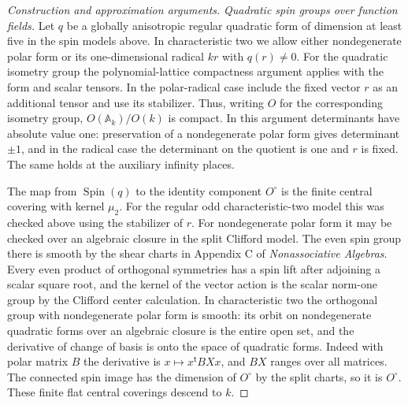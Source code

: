 \documentclass[11pt,a4paper,openany,oneside]{book}
\theoremstyle{resultstyle}
\theoremstyle{definition}
\numberwithin{equation}{chapter}
\begin{document}
\begin{proof}[Construction and approximation arguments]
\medskip\noindent
\textit{Quadratic spin groups over function fields.}
Let \(q\) be a globally anisotropic regular quadratic
form of dimension at least five in the spin models
above. In characteristic two we allow either
nondegenerate polar form or its one-dimensional
radical \(kr\) with \(q(r)\ne0\). For the quadratic
isometry group the polynomial-lattice compactness
argument applies with the form and scalar tensors.
In the polar-radical case include the fixed vector
\(r\) as an additional tensor and use its stabilizer.
Thus, writing \(O\) for the corresponding isometry
group, \(O(\mathbb A_k)/O(k)\) is compact. In this
argument determinants have absolute value one:
preservation of a nondegenerate polar form gives
determinant \(\pm1\), and in the radical case the
determinant on the quotient is one and \(r\) is fixed.
The same holds at the auxiliary infinity places.

The map from \(\operatorname{Spin}(q)\) to the
identity component \(O^\circ\) is the finite
central covering with kernel \(\mu_2\).
For the regular odd characteristic-two model this
was checked above using the stabilizer of \(r\).
For nondegenerate polar form it may be checked over
an algebraic closure in the split Clifford model.
The even spin group there is smooth by the shear
charts in Appendix C of \emph{Nonassociative Algebras}.
Every even product of orthogonal symmetries has a
spin lift after adjoining a scalar square root, and
the kernel of the vector action is the scalar
norm-one group by the Clifford center calculation.
In characteristic two the orthogonal group with
nondegenerate polar form is smooth: its orbit on
nondegenerate quadratic forms over an algebraic
closure is the entire open set, and the derivative
of change of basis is onto the space of quadratic
forms. Indeed with polar matrix \(B\) the derivative
is \(x\mapsto x^{\mathsf t} B X x\), and \(BX\)
ranges over all matrices. The connected spin image
has the dimension of \(O^\circ\) by the split charts,
so it is \(O^\circ\). These finite flat central
coverings descend to \(k\).


\end{proof}
\end{document}
